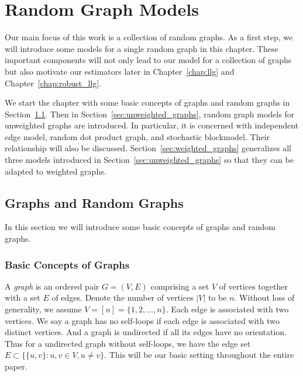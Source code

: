 
\chapter{Random Graph Models}
\label{chap:random_graphs}

Our main focus of this work is a collection of random graphs. As a first step, we will introduce some models for a single random graph in this chapter. These important components will not only lead to our model for a collection of graphs but also motivate our estimators later in Chapter~\ref{chap:llg} and Chapter~\ref{chap:robust_llg}.

We start the chapter with some basic concepts of graphs and random graphs in Section~\ref{sec:graphs_random_graphs}. Then in Section~\ref{sec:unweighted_graphs}, random graph models for unweighted graphs are introduced. In particular, it is concerned with independent edge model, random dot product graph, and stochastic blockmodel. Their relationship will also be discussed. Section~\ref{sec:weighted_graphs} generalizes all three models introduced in Section~\ref{sec:unweighted_graphs} so that they can be adapted to weighted graphs.


\section{Graphs and Random Graphs}
\label{sec:graphs_random_graphs}

In this section we will introduce some basic concepts of graphs and random graphs. 

\subsection{Basic Concepts of Graphs}
\label{sec:graph_concept}

A {\em{graph}} is an ordered pair $G = (V, E)$ comprising a set $V$ of vertices together with a set $E$ of edges. Denote the number of vertices $|V|$ to be $n$. Without loss of generality, we assume $V = [n] = \{1, 2, \dots, n\}$. Each edge is associated with two vertices. We say a graph has no self-loops if each edge is associated with two distinct vertices. And a graph is undirected if all its edges have no orientation. Thus for a undirected graph without self-loops, we have the edge set $E \subset \{ \{u, v\}: u, v \in V, u \ne v \}$. This will be our basic setting throughout the entire paper.

